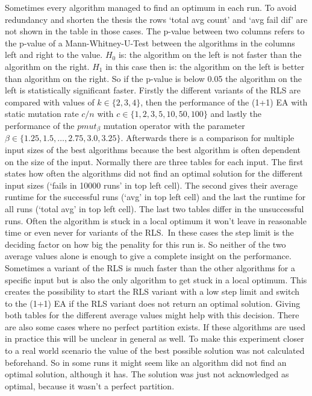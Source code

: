 Sometimes every algorithm managed to find an optimum in each run.
To avoid redundancy and shorten the thesis the rows `total avg count' and `avg fail dif' are not shown in the table in those cases.
The p-value between two columns refers to the p-value of a Mann-Whitney-U-Test between the algorithms in the columns left and right to the value.
$H_0$ is: the algorithm on the left is not faster than the algorithm on the right.
$H_1$ in this case then is: the algorithm on the left is better than algorithm on the right.
So if the p-value is below 0.05 the algorithm on the left is statistically significant faster.\newline
Firstly the different variants of the RLS are compared with values of $k \in\{2,3,4\}$, then the performance of the (1+1) EA with static mutation rate $c/n$ with $c \in\{1,2,3,5,10,50,100\}$ and lastly the performance of the $pmut_\beta$ mutation operator with the parameter $\beta \in \{1.25, 1.5, \dots, 2.75,3.0,3.25\}$.
Afterwards there is a comparison for multiple input sizes of the best algorithms because the best algorithm is often dependent on the size of the input.
Normally there are three tables for each input.
The first states how often the algorithms did not find an optimal solution for the different input sizes (`fails in 10000 runs' in top left cell).
The second gives their average runtime for the successful runs (`avg' in top left cell) and the last the runtime for all runs (`total avg' in top left cell).
The last two tables differ in the unsuccessful runs.
Often the algorithm is stuck in a local optimum it won't leave in reasonable time or even never for variants of the RLS.\
In these cases the step limit is the deciding factor on how big the penality for this run is.
So neither of the two average values alone is enough to give a complete insight on the performance.
Sometimes a variant of the RLS is much faster than the other algorithms for a specific input but is also the only algorithm to get stuck in a local optimum.
This creates the possibility to start the RLS variant with a low step limit and switch to the (1+1) EA if the RLS variant does not return an optimal solution.
Giving both tables for the different average values might help with this decision.
There are also some cases where no perfect partition exists.
If these algorithms are used in practice this will be unclear in general as well.
To make this experiment closer to a real world scenario the value of the best possible solution was not calculated beforehand.
So in some runs it might seem like an algorithm did not find an optimal solution, although it has.
The solution was just not acknowledged as optimal, because it wasn't a perfect partition.

